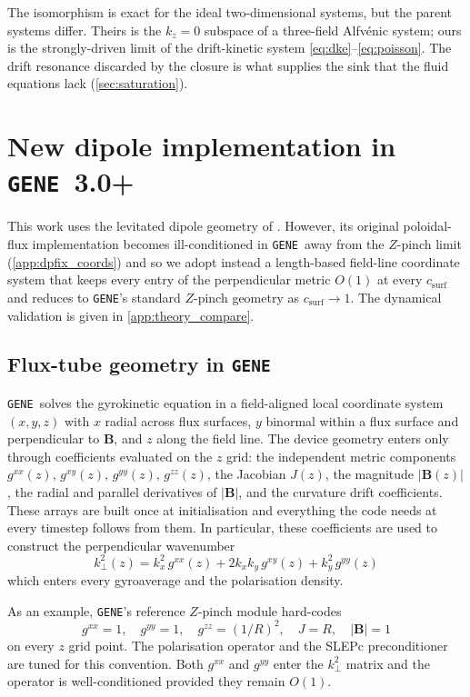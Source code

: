 \documentclass{jpp}
\newcommand{\order}[1]{O\left(#1\right)}
\newcommand{\bB}{\mathbf{B}}
\newcommand{\kperp}{k_\perp}
\newcommand{\gene}{\texttt{GENE}}
\begin{document}
The isomorphism is exact for the ideal two-dimensional systems, but the parent systems differ. Theirs is the $k_z = 0$ subspace of a three-field Alfv\'enic system; ours is the strongly-driven limit of the drift-kinetic system \cref{eq:dke}--\cref{eq:poisson}. The drift resonance discarded by the closure is what supplies the sink that the fluid equations lack (\cref{sec:saturation}).


\section{New dipole implementation in \gene\ 3.0+}\label{app:dipole_impl}

This work uses the levitated dipole geometry of \citet{Kennedy2020}. However, its original poloidal-flux implementation becomes ill-conditioned in \gene\ away from the $Z$-pinch limit (\cref{app:dpfix_coords}) and so we adopt instead a length-based field-line coordinate system that keeps every entry of the perpendicular metric $\order{1}$ at every $c_\mathrm{surf}$ and reduces to \gene's standard $Z$-pinch geometry as $c_\mathrm{surf} \to 1$. The dynamical validation is given in \cref{app:theory_compare}.

\subsection{Flux-tube geometry in \gene}\label{app:gene_geom_basics}

\gene\ solves the gyrokinetic equation in a field-aligned local coordinate system $(x, y, z)$ with $x$ radial across flux surfaces, $y$ binormal within a flux surface and perpendicular to $\bB$, and $z$ along the field line. The device geometry enters only through coefficients evaluated on the $z$ grid: the independent metric components $g^{xx}(z), \, g^{xy}(z), \, g^{yy}(z),\, g^{zz}(z)$, the Jacobian $J(z)$, the magnitude $|\bB(z)|$, the radial and parallel derivatives of $|\bB|$, and the curvature drift coefficients. These arrays are built once at initialisation and everything the code needs at every timestep follows from them. In particular, these coefficients are used to construct the perpendicular wavenumber
\begin{equation}
\kperp^2(z) = k_x^2\,g^{xx}(z) + 2 k_x k_y\,g^{xy}(z) + k_y^2\,g^{yy}(z)
\label{eq:kperp_app}
\end{equation}
which enters every gyroaverage and the polarisation density.

As an example, \gene's reference $Z$-pinch module hard-codes
\begin{equation}
g^{xx} = 1, \quad g^{yy} = 1, \quad g^{zz} = (1/R)^2,
\quad J = R, \quad |\bB| = 1
\label{eq:zpinch_metric}
\end{equation}
on every $z$ grid point. The polarisation operator and the SLEPc preconditioner \citep{Roman2010} are tuned for this convention. Both $g^{xx}$ and $g^{yy}$ enter the $\kperp^2$ matrix and the operator is well-conditioned provided they remain $\order{1}$. 
\end{document}
